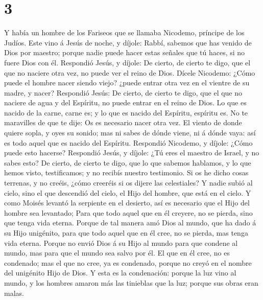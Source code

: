\hypertarget{section-2}{%
\section{3}\label{section-2}}

 Y había un hombre de los Fariseos que se llamaba
Nicodemo, príncipe de los Judíos.  Este vino á Jesús de
noche, y díjole: Rabbí, sabemos que has venido de Dios por maestro;
porque nadie puede hacer estas señales que tú haces, si no fuere Dios
con él.  Respondió Jesús, y díjole: De cierto, de cierto
te digo, que el que no naciere otra vez, no puede ver el reino de Dios.
 Dícele Nicodemo: ¿Cómo puede el hombre nacer siendo
viejo? ¿puede entrar otra vez en el vientre de su madre, y nacer?
 Respondió Jesús: De cierto, de cierto te digo, que el que
no naciere de agua y del Espíritu, no puede entrar en el reino de Dios.
 Lo que es nacido de la carne, carne es; y lo que es
nacido del Espíritu, espíritu es.  No te maravilles de que
te dije: Os es necesario nacer otra vez.  El viento de
donde quiere sopla, y oyes su sonido; mas ni sabes de dónde viene, ni á
dónde vaya: así es todo aquel que es nacido del Espíritu. 
Respondió Nicodemo, y díjole: ¿Cómo puede esto hacerse? 
Respondió Jesús, y díjole: ¿Tú eres el maestro de Israel, y no sabes
esto?  De cierto, de cierto te digo, que lo que sabemos
hablamos, y lo que hemos visto, testificamos; y no recibís nuestro
testimonio.  Si os he dicho cosas terrenas, y no creéis,
¿cómo creeréis si os dijere las celestiales?  Y nadie
subió al cielo, sino el que descendió del cielo, el Hijo del hombre, que
está en el cielo.  Y como Moisés levantó la serpiente en
el desierto, así es necesario que el Hijo del hombre sea levantado;
 Para que todo aquel que en él creyere, no se pierda,
sino que tenga vida eterna.  Porque de tal manera amó
Dios al mundo, que ha dado á su Hijo unigénito, para que todo aquel que
en él cree, no se pierda, mas tenga vida eterna.  Porque
no envió Dios á su Hijo al mundo para que condene al mundo, mas para que
el mundo sea salvo por él.  El que en él cree, no es
condenado; mas el que no cree, ya es condenado, porque no creyó en el
nombre del unigénito Hijo de Dios.  Y esta es la
condenación: porque la luz vino al mundo, y los hombres amaron más las
tinieblas que la luz; porque sus obras eran malas. 
